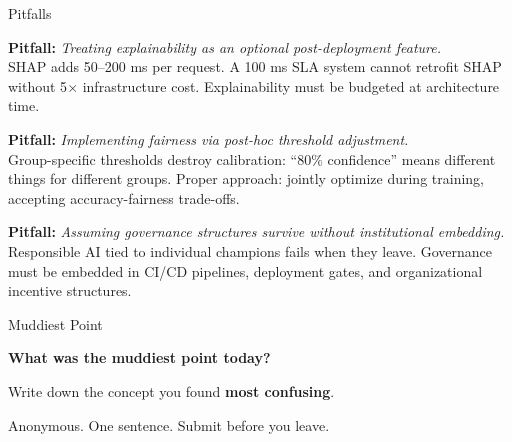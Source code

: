 \documentclass[aspectratio=169, 12pt]{beamer}
\begin{document}
\begin{frame}{Pitfalls}

\footnotesize
\textbf{Pitfall:} \textit{Treating explainability as an optional post-deployment feature.}\\
SHAP adds 50--200 ms per request. A 100 ms SLA system cannot retrofit SHAP without 5$\times$ infrastructure cost. Explainability must be budgeted at architecture time.

\vspace{0.15cm}
\textbf{Pitfall:} \textit{Implementing fairness via post-hoc threshold adjustment.}\\
Group-specific thresholds destroy calibration: ``80\% confidence'' means different things for different groups. Proper approach: jointly optimize during training, accepting accuracy-fairness trade-offs.

\vspace{0.15cm}
\textbf{Pitfall:} \textit{Assuming governance structures survive without institutional embedding.}\\
Responsible AI tied to individual champions fails when they leave. Governance must be embedded in CI/CD pipelines, deployment gates, and organizational incentive structures.

\end{frame}


\begin{frame}{Muddiest Point}

\centering
\vspace{1.0cm}
{\Large\bfseries What was the \alert{muddiest point} today?}

\vspace{0.8cm}
{\normalsize Write down the concept you found \textbf{most confusing}.}

\vspace{0.5cm}
{\small\textcolor{midgray}{Anonymous. One sentence. Submit before you leave.}}

\end{frame}
\end{document}

